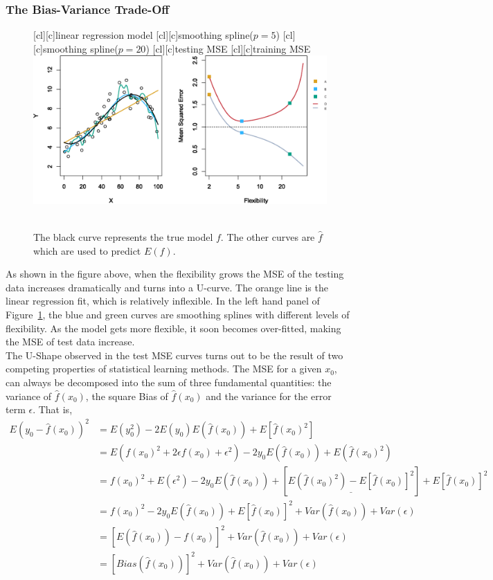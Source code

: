\documentclass[12pt,a4paper]{article}%
\theoremstyle{definition}
\theoremstyle{plain}
\numberwithin{equation}{section}
\begin{document}
\subsubsection{\textbf{The Bias-Variance Trade-Off}}

\begin{figure}[H]
\centering
{}[cl][c]{\tiny linear regression model}
[cl][c]{\tiny smoothing spline($p=5$)}
[cl][c]{\tiny smoothing spline($p=20$)}
[cl][c]{\tiny testing MSE}
[cl][c]{\tiny training MSE}
\includegraphics[scale=0.7]{images//2_9.eps}
\\~\\
\caption{The black curve represents the true model $f$. The other curves are $\hat{f}$ which are used to predict $E(f)$.}\label{figure-2.9}
\end{figure}

As shown in the figure above, when the flexibility grows the MSE of the testing data increases dramatically and turns into a U-curve.
The orange line is the linear regression fit, which is relatively inflexible. In the left hand panel of Figure~\ref{figure-2.9}, the blue and green curves are smoothing splines with different levels of flexibility.
As the model gets more flexible, it soon becomes over-fitted, making the MSE of test data increase. \\

The U-Shape observed in the test MSE curves turns out to be the result of two competing properties of statistical learning methods.
The MSE for a given $x_{0}$, can always be decomposed into the sum of three fundamental quantities:
the variance of $\hat{f}(x_{0})$, the square Bias of $\hat{f}(x_{0})$ and the variance for the error term $\epsilon$. That is,
\begin{align*}
E(y_{0}-\hat{f}(x_{0}))^{2} & = E(y_{0}^2)-2E(y_{0})E(\hat{f}(x_{0})) + E [\hat{f}(x_{0})^{2}] \\
& = E(f(x_{0})^2 + 2\epsilon f(x_{0})+\epsilon^{2})-2y_{0}E(\hat{f}(x_{0})) + E (\hat{f}(x_{0})^{2}) \\
& = f(x_{0})^2 + E(\epsilon^{2})-2y_{0}E(\hat{f}(x_{0})) + [\underline{E(\hat{f}(x_{0})^{2})- E [\hat{f}(x_{0})]^{2}}] + E [\hat{f}(x_{0})]^{2} \\
& = f(x_{0})^2-2y_{0}E(\hat{f}(x_{0}))+ E [\hat{f}(x_{0})]^{2} + Var(\hat{f}(x_{0}))+Var(\epsilon) \\
& = [E(\hat{f}(x_{0}))-f(x_{0})]^{2}+ Var(\hat{f}(x_{0}))+Var(\epsilon) \\
& = [Bias(\hat{f}(x_{0}))]^{2}+ Var(\hat{f}(x_{0}))+Var(\epsilon)
\end{align*}
\end{document}
